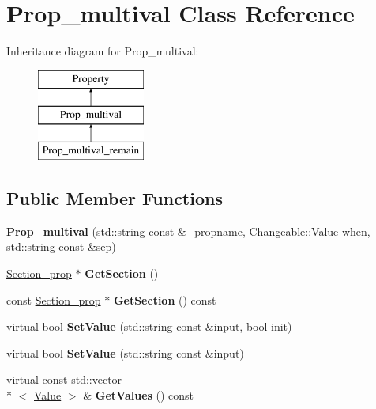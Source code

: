 \hypertarget{classProp__multival}{\section{Prop\-\_\-multival Class Reference}
\label{classProp__multival}
}
Inheritance diagram for Prop\-\_\-multival\-:\begin{figure}[H]
\begin{center}
\leavevmode
\includegraphics[height=3.000000cm]{classProp__multival}
\end{center}
\end{figure}
\subsection*{Public Member Functions}
\begin{DoxyCompactItemize}
\item 
\hypertarget{classProp__multival_aa579fe534016bb823422f77b42159f15}{{\bfseries Prop\-\_\-multival} (std\-::string const \&\-\_\-propname, Changeable\-::\-Value when, std\-::string const \&sep)}\label{classProp__multival_aa579fe534016bb823422f77b42159f15}

\item 
\hypertarget{classProp__multival_a1856ec3db2ba38e9a36564e5857ea905}{\hyperlink{classSection__prop}{Section\-\_\-prop} $\ast$ {\bfseries Get\-Section} ()}\label{classProp__multival_a1856ec3db2ba38e9a36564e5857ea905}

\item 
\hypertarget{classProp__multival_a3fbc56edc9f80a60ddb42f1e583a4449}{const \hyperlink{classSection__prop}{Section\-\_\-prop} $\ast$ {\bfseries Get\-Section} () const }\label{classProp__multival_a3fbc56edc9f80a60ddb42f1e583a4449}

\item 
\hypertarget{classProp__multival_afbcf30bd2ed62ec5e436dcb47ec00245}{virtual bool {\bfseries Set\-Value} (std\-::string const \&input, bool init)}\label{classProp__multival_afbcf30bd2ed62ec5e436dcb47ec00245}

\item 
\hypertarget{classProp__multival_a9aab89f6735b3c055d991fed7b622b91}{virtual bool {\bfseries Set\-Value} (std\-::string const \&input)}\label{classProp__multival_a9aab89f6735b3c055d991fed7b622b91}

\item 
\hypertarget{classProp__multival_abef7b1933aab903c4b446aa15ca4fd8e}{virtual const std\-::vector\\*
$<$ \hyperlink{classValue}{Value} $>$ \& {\bfseries Get\-Values} () const }\label{classProp__multival_abef7b1933aab903c4b446aa15ca4fd8e}

\end{DoxyCompactItemize}
